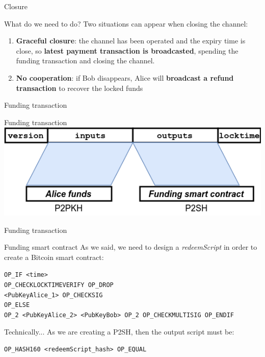 \documentclass{beamer}
\begin{document}
\begin{frame}{Closure}
 \begin{block}{What do we need to do?}
  Two situations can appear when closing the channel:
  \begin{enumerate}
   \item \textbf{Graceful closure}: the channel has been operated and the expiry time is close, so \textbf{latest payment transaction is broadcasted}, spending the funding transaction and closing the channel.
   \item \textbf{No cooperation}: if Bob disappears, Alice will \textbf{broadcast a refund transaction} to recover the locked funds
  \end{enumerate}
 \end{block}
\end{frame}
\begin{frame}{Funding transaction}
 \begin{exampleblock}{Funding transaction}
  \includegraphics[width=\textwidth, height=0.8\textheight, keepaspectratio]{img/unidir_tx_funding.png}
 \end{exampleblock}
\end{frame}
\begin{frame}{Funding transaction}
 \begin{exampleblock}{Funding smart contract}
  As we said, we need to design a \textit{redeemScript} in order to create a Bitcoin smart contract:
  \begin{center}
   \texttt{OP\_IF <time>}\\
   \texttt{OP\_CHECKLOCKTIMEVERIFY OP\_DROP}\\
   \texttt{<PubKeyAlice\_1> OP\_CHECKSIG}\\
   \texttt{OP\_ELSE}\\
   \texttt{OP\_2 <PubKeyAlice\_2> <PubKeyBob> OP\_2 OP\_CHECKMULTISIG OP\_ENDIF}
  \end{center}
 \end{exampleblock}
 \begin{exampleblock}{Technically...}
  As we are creating a P2SH, then the output script must be:\
  \begin{center}
   \texttt{OP\_HASH160 <redeemScript\_hash> OP\_EQUAL}
  \end{center}
 \end{exampleblock}
\end{frame}
\end{document}
